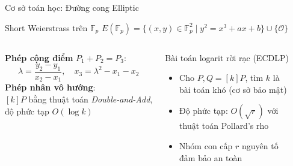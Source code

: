 \begin{frame}{Cơ sở toán học: Đường cong Elliptic}
  \begin{block}{Short Weierstrass trên $\mathbb{F}_p$}
    $E(\mathbb{F}_p) = \{(x,y)\in\mathbb{F}_p^2 \mid y^2 = x^3 + ax + b\} \cup \{\mathcal{O}\}$
  \end{block}
  \begin{columns}[t]
      \textbf{Phép cộng điểm} $P_1 + P_2 = P_3$:
      \[
        \lambda = \frac{y_2 - y_1}{x_2 - x_1}, \quad
        x_3 = \lambda^2 - x_1 - x_2
      \]
      \textbf{Phép nhân vô hướng}:\\
      $[k]P$ bằng thuật toán \emph{Double-and-Add},\\
      độ phức tạp $O(\log k)$
      \begin{block}{Bài toán logarit rời rạc (ECDLP)}
        \begin{itemize}
          \item Cho $P, Q = [k]P$, tìm $k$ là\\bài toán khó (cơ sở bảo mật)
          \item Độ phức tạp: $O(\sqrt{r})$ với\\thuật toán Pollard's rho
          \item Nhóm con cấp $r$ nguyên tố\\đảm bảo an toàn
        \end{itemize}
      \end{block}
  \end{columns}
\end{frame}
